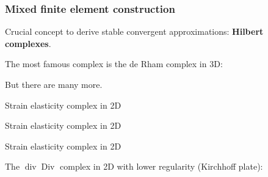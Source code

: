 \documentclass[aspectratio=169]{beamer}
\DeclareMathOperator*{\grad}{grad}
\DeclareMathOperator*{\Grad}{Grad}
\DeclareMathOperator*{\Div}{Div}
\renewcommand{\div}{\operatorname{div}}
\DeclareMathOperator*{\curl}{curl}
\DeclareMathOperator*{\rot}{rot}
\newcommand{\bbR}{\mathbb{R}}
\newcommand{\bbS}{\mathbb{S}}
\begin{document}
\begin{frame}[fragile]\frametitle{Mixed finite element construction}
	Crucial concept to derive stable convergent approximations: \textbf{Hilbert complexes}.
	
	The most famous complex is the de Rham complex in 3D:
	\begin{figure}[h]
		\centering
	\end{figure}
But there are many more. 
\begin{tcolorbox}[width=0.95\textwidth, nobeforeafter, colframe=theme,title=Planar elastodynamics]
	Strain elasticity complex in 2D 
	\begin{figure}[h]
		\centering
	\end{figure}
\end{tcolorbox}

\begin{tcolorbox}[width=0.95\textwidth, nobeforeafter, colframe=theme,title=Planar elastodynamics]
	Strain elasticity complex in 2D 
	\begin{figure}[h]
		\centering
	\end{figure}
\end{tcolorbox}

Strain elasticity complex in 2D 




The $\div\Div$ complex in 2D with lower regularity (Kirchhoff plate):
\begin{figure}[h]
	\centering
\end{figure}
\end{frame}
\end{document}
